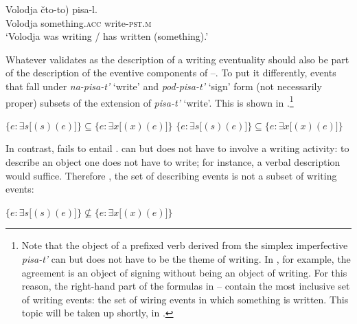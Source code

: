 \documentclass[output=paper,colorlinks,citecolor=brown]{langscibook}
\begin{document}
\ea\label{ex:tatevosov:70}
\gll Volodja  \minsp{(} čto-to)  pisa-l.\\
  Volodja  {} something.\textsc{acc}  write-\textsc{pst.m}\\
\glt ‘Volodja was writing / has written (something).’
\z

\noindent Whatever validates  as the description of a writing eventuality should also be part of the description of the eventive components of --. To put it differently, events that fall under \textit{na-pisa-t’} ‘write’ and \textit{pod-pisa-t’} ‘sign’ form (not necessarily proper) subsets of the extension of \textit{pisa-t’} ‘write’. This is shown in .\footnote{Note that the object of a prefixed verb derived from the simplex imperfective \textit{pisa-t’} can but does not have to be the theme of writing. In , for example, the agreement is an object of signing without being  an object of writing. For this reason, the right-hand part of the formulas in -- contain the most inclusive set of writing events: the set of wiring events in which something is written. This topic will be taken up shortly, in .}

\ea\label{ex:tatevosov:71}
\ea    $\{e: {\exists} s[$$(s)(e)]\} \subseteq \{e: \exists x[$$(x)(e)]\}$\label{ex:tatevosov:71a}
  \ex    $\{e: \exists s[$$(s)(e)]\} \subseteq \{e: \exists x[$$(x)(e)]\}$\label{ex:tatevosov:71b}
\z
\z

\noindent In contrast,  fails to entail .  can but does not have to involve a writing activity: to describe an object one does not have to write; for instance, a verbal description would suffice. Therefore%
, the set of describing events is not a subset of writing events:%

\ea   $\{e: \exists s[$$(s)(e)]\} \nsubseteq \{e: \exists x[$$(x)(e)]\}$\label{ex:tatevosov:72}
\z
\end{document}
